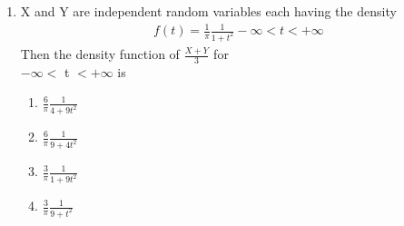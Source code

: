 \renewcommand{\theequation}{\theenumi}
\renewcommand{\thefigure}{\theenumi}
\begin{enumerate}[label=\thesection.\arabic*.,ref=\thesection.\theenumi]

%
\item X and Y are independent random variables each having the density
\begin{align}
    f(t) = \displaystyle\frac{1}{\pi} \frac{1}{1+{t}^2} -\infty < t < +\infty
\end{align}
Then the density function of $\displaystyle\frac{X+Y}{3}$ for \\$-\infty <$ t $< +\infty$ is\bigskip
    \begin{enumerate}\itemsep0.5cm
        \item $\displaystyle\frac{6}{\pi} \frac{1}{4+9{t}^2}$
        \item $\displaystyle\frac{6}{\pi} \frac{1}{9+4{t}^2}$
        \item $\displaystyle\frac{3}{\pi} \frac{1}{1+9{t}^2}$
        \item $\displaystyle\frac{3}{\pi} \frac{1}{9+{t}^2}$
    \end{enumerate}


\end{enumerate}
